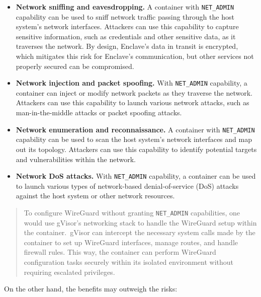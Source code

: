 \documentclass[a4paper, twocolumn]{article}
\begin{document}
\begin{itemize}

\item \textbf{Network sniffing and eavesdropping.} A container with
\texttt{NET\_ADMIN} capability can be used to sniff network traffic passing
through the host system's network interfaces. Attackers can use this
capability to capture sensitive information, such as credentials and other
sensitive data, as it traverses the network. By design, Enclave's data in
transit is encrypted, which mitigates this risk for Enclave's
communication, but other services not properly secured can be compromised.

\item \textbf{Network injection and packet spoofing.} With \texttt{NET\_ADMIN}
capability, a container can inject or modify network packets as they traverse
the network. Attackers can use this capability to launch various network
attacks, such as man-in-the-middle attacks or packet spoofing attacks.

\item \textbf{Network enumeration and reconnaissance.} A container with
\texttt{NET\_ADMIN} capability can be used to scan the host system's network
interfaces and map out its topology. Attackers can use this capability to
identify potential targets and vulnerabilities within the network.

\item \textbf{Network DoS attacks.} With \texttt{NET\_ADMIN} capability, a
container can be used to launch various types of network-based
denial-of-service (DoS) attacks against the host system or other network
resources.

\end{itemize}

\begin{quote}
To configure WireGuard without granting \texttt{NET\_ADMIN} capabilities, one would use
gVisor's networking stack to handle the WireGuard setup within the container.\ 
gVisor can intercept the necessary system calls made by the container to set
up WireGuard interfaces, manage routes, and handle firewall rules. This way,
the container can perform WireGuard configuration tasks securely within its
isolated environment without requiring escalated privileges.
\end{quote}


On the other hand, the benefits may outweigh the risks:
\end{document}
